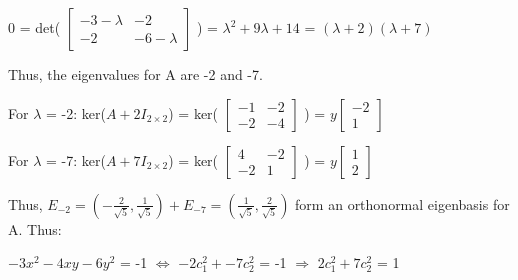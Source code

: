 \begin{tbox}
        \hspace{0.5cm}
        0 =
        det(
        \scriptsize
        $\begin{bmatrix}
            -3-\lambda & -2 \\
            -2 & -6-\lambda
        \end{bmatrix}$
        \normalsize)
        = $\lambda^2 + 9\lambda + 14$
        = $(\lambda+2)(\lambda+7)$

        Thus, the eigenvalues for A are -2 and -7.

        \hspace{0.5cm}
        For $\lambda$ = -2:
        \hspace{0.5cm}
        ker($A + 2I_{2 \times 2}$) =
        ker(
        \scriptsize
        $\begin{bmatrix}
            -1 & -2 \\
            -2 & -4
        \end{bmatrix}$
        \normalsize) =
        \scriptsize
        $y\begin{bmatrix}
            -2 \\
            1
        \end{bmatrix}$
        \normalsize

        \hspace{0.5cm}
        For $\lambda$ = -7:
        \hspace{0.5cm}
        ker($A + 7I_{2 \times 2}$) =
        ker(
        \scriptsize
        $\begin{bmatrix}
            4 & -2 \\
            -2 & 1
        \end{bmatrix}$
        \normalsize) =
        \scriptsize
        $y\begin{bmatrix}
            1 \\
            2
        \end{bmatrix}$
        \normalsize

        Thus,
        $E_{-2} = (-\frac{2}{\sqrt{5}},\frac{1}{\sqrt{5}})
        + E_{-7} = (\frac{1}{\sqrt{5}},\frac{2}{\sqrt{5}})$
        form an orthonormal eigenbasis for A. Thus:

        \hspace{0.5cm}
        $-3x^2 - 4xy - 6y^2$ = -1
        \hspace{0.5cm}
        $\Leftrightarrow$
        \hspace{0.5cm}
        $-2c_1^2 + -7c_2^2$ = -1
        \hspace{0.5cm}
        $\Rightarrow$
        \hspace{0.5cm}
        $2c_1^2 + 7c_2^2$ = 1
        

\end{tbox}

